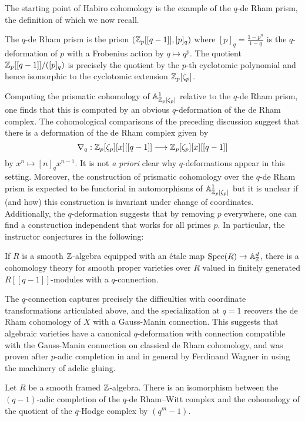 The starting point of Habiro cohomology is the example of the $q$-de Rham prism, the definition of which we now recall. 
\begin{example}
    The $q$-de Rham prism is the prism $(\mathbb{Z}_{p}[[q-1]],[p]_{q})$ where $[p]_{q}=\frac{1-p^{n}}{1-q}$ is the $q$-deformation of $p$ with a Frobenius action by $q\mapsto q^{p}$. The quotient $\mathbb{Z}_{p}[[q-1]]/([p]_{q})$ is precisely the quotient by the $p$-th cyclotomic polynomial and hence isomorphic to the cyclotomic extension $\mathbb{Z}_{p}[\zeta_{p}]$. 
\end{example}
Computing the prismatic cohomology of $\mathbb{A}^{1}_{\mathbb{Z}_{p}[\zeta_{p}]}$ relative to the $q$-de Rham prism, one finds that this is computed by an obvious $q$-deformation of the de Rham complex. The cohomological comparisons of the preceding discussion suggest that there is a deformation of the de Rham complex given by 
$$\nabla_{q}:\mathbb{Z}_{p}[\zeta_{p}][x][[q-1]]\longrightarrow\mathbb{Z}_{p}[\zeta_{p}][x][[q-1]]$$
by $x^{n}\mapsto [n]_{q}x^{n-1}$. It is not \emph{a priori} clear why $q$-deformations appear in this setting. Moreover, the construction of prismatic cohomology over the $q$-de Rham prism is expected to be functorial in automorphisms of $\mathbb{A}^{1}_{\mathbb{Z}_{p}[\zeta_{p}]}$ but it is unclear if (and how) this construction is invariant under change of coordinates. Additionally, the $q$-deformation suggests that by removing $p$ everywhere, one can find a construction independent that works for all primes $p$. In particular, the instructor conjectures in \cite{qDeformations} the following:
\begin{conjecture}
    If $R$ is a smooth $\mathbb{Z}$-algebra equipped with an \'{e}tale map $\operatorname{Spec}(R)\to\mathbb{A}^{d}_{\mathbb{Z}}$, there is a cohomology theory for smooth proper varieties over $R$ valued in finitely generated $R[[q-1]]$-modules with a $q$-connection. 
\end{conjecture}
The $q$-connection captures precisely the difficulties with coordinate transformations articulated above, and the specialization at $q=1$ recovers the de Rham cohomology of $X$ with a Gauss-Manin connection. This suggests that algebraic varieties have a canonical $q$-deformation with connection compatible with the Gauss-Manin connection on classical de Rham cohomology, and was proven after $p$-adic completion in \cite{PrismsPrismatic} and in general by Ferdinand Wagner in \cite{WagnerQWittQHodge} using the machinery of adelic gluing.  
\begin{theorem}\label{thm: Wagner qHodge}
    Let $R$ be a smooth framed $\mathbb{Z}$-algebra. There is an isomorphism between the $(q-1)$-adic completion of the $q$-de Rham--Witt complex and the cohomology of the quotient of the $q$-Hodge complex by $(q^{m}-1)$. 
\end{theorem}
